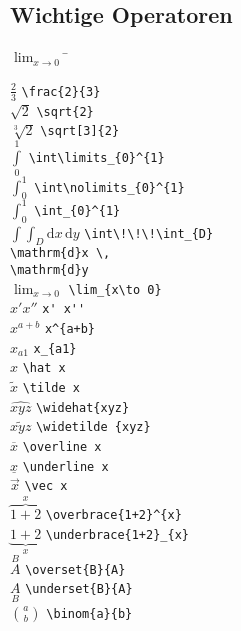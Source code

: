 \subsection{Wichtige Operatoren}
\begin{tabbing}
$\lim_{x\to 0}$ \hspace{2em}	\= 	\kill

$\frac{2}{3}$			\>	\lstinline|\frac{2}{3}|	\\
$\sqrt{2}$				\> 	\lstinline|\sqrt{2}|		\\
$\sqrt[3]{2}$			\> 	\lstinline|\sqrt[3]{2}|	\\
$\int \limits_{0}^{1}$			\> 	\lstinline|\int\limits_{0}^{1}|	\\
$\int\nolimits_{0}^{1}$		\> 	\lstinline|\int\nolimits_{0}^{1}|	\\
$\int_{0}^{1}$		\> 	\lstinline|\int_{0}^{1}|	\\

$\int\!\!\!\int_{D} \mathrm{d}x\,\mathrm{d}y$		
	\> 	\lstinline|\int\!\!\!\int_{D}| 	\\
	\> \lstinline|\mathrm{d}x \,| \\
	\> \lstinline|\mathrm{d}y|	\\
	
$\lim_{x\to 0}$		\> 	\lstinline|\lim_{x\to 0}|	\\
$x' x''$						\> \lstinline|x' x''| \\
$x^{a+b}$		\> 	\lstinline|x^{a+b}|	\\
$x_{a1}$		\> 	\lstinline|x_{a1}|	\\

$\hat x$							\> 	\lstinline|\hat x|	\\
$\tilde x$						\> 	\lstinline|\tilde x|	\\
$\widehat{xyz}$				\> 	\lstinline|\widehat{xyz}|	\\
$\widetilde {xyz}$		\> 	\lstinline|\widetilde {xyz}|	\\
$\overline x$					\> 	\lstinline|\overline x|	\\
$\underline x$				\> 	\lstinline|\underline x|	\\
$\vec x$							\>  \lstinline|\vec x| \\
$\overbrace{1+2}^{x}$		\> 	\lstinline|\overbrace{1+2}^{x}|	\\
$\underbrace{1+2}_{x}$		\> 	\lstinline|\underbrace{1+2}_{x}|	\\
$\overset{B}{A}$		\> 	\lstinline|\overset{B}{A}|	\\[1ex]
$\underset{B}{A}$		\> 	\lstinline|\underset{B}{A}| \\[1ex]
${\binom{a}{b}}$		\> 	\lstinline|\binom{a}{b}|
\end{tabbing}

